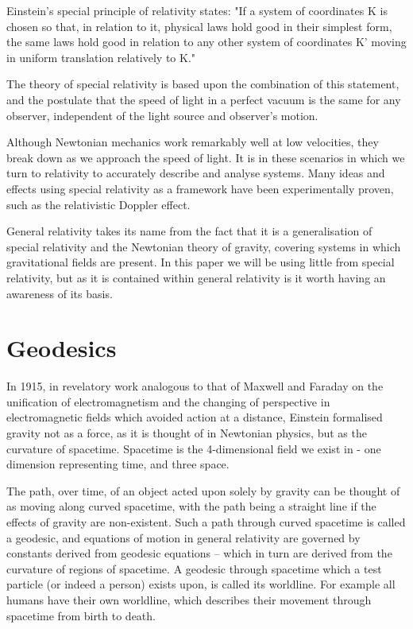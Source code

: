 \documentclass[oneside,openright,frontopenright, singlespacing]{dmathesis}
\begin{document}
\vspace{1em}
	Einstein's special principle of relativity states\cite{einstein1923grundlage}: "If a system of coordinates K is chosen so that, in relation to it, physical laws hold good in their simplest form, the same laws hold good in relation to any other system of coordinates K' moving in uniform translation relatively to K."

\vspace{1em}
	The theory of special relativity is based upon the combination of this statement, and the postulate that the speed of light in a perfect vacuum is the same for any observer, independent of the light source and observer's motion.

\vspace{1em}
	Although Newtonian mechanics work remarkably well at low velocities, they break down as we approach the speed of light. It is in these scenarios in which we turn to relativity to accurately describe and analyse systems. Many ideas and effects using special relativity as a framework have been experimentally proven, such as the relativistic Doppler effect.

\vspace{1em}
	General relativity takes its name from the fact that it is a generalisation of special relativity and the Newtonian theory of gravity, covering systems in which gravitational fields are present. In this paper we will be using little from special relativity, but as it is contained within general relativity is it worth having an awareness of its basis.

\section{Geodesics}\label{sec:Section2.2}
	
	In 1915, in revelatory work analogous to that of Maxwell and Faraday on the unification of electromagnetism and the changing of perspective in electromagnetic fields which avoided action at a distance, Einstein formalised gravity not as a force, as it is thought of in Newtonian physics, but as the curvature of spacetime. Spacetime is the 4-dimensional field we exist in - one dimension representing time, and three space. 

\vspace{1em}
	The path, over time, of an object acted upon solely by gravity can be thought of as moving along curved spacetime, with the path being a straight line if the effects of gravity are non-existent. Such a path through curved spacetime is called a geodesic, and equations of motion in general relativity are governed by constants derived from geodesic equations – which in turn are derived from the curvature of regions of spacetime. A geodesic through spacetime which a test particle (or indeed a person) exists upon, is called its worldline. For example all humans have their own worldline, which describes their movement through spacetime from birth to death.
\end{document}

